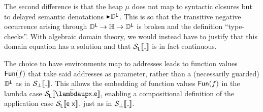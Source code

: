 The second difference is that the heap $μ$ does not map to syntactic closures
but to delayed semantic denotations $\later \VanD$.
This is so that the transitive negative occurrence arising through
${\mathbb{D}^{\mathop{\mathsf{L}}}} \to \mathbb{H} \to {\mathbb{D}^{\mathop{\mathsf{L}}}}$ is broken and the definition ``type-checks''.
With algebraic domain theory, we would instead have to justify that this
domain equation has a solution and that $\semvan{\wild}$ is in fact continuous.

The choice to have environments map to addresses leads to function values
$\mathsf{Fun}(f)$ that take said addresses as parameter, rather than a (necessarily
guarded) ${\mathbb{D}^{\mathop{\mathsf{L}}}}$ as in $\semscott{\wild}$.%
This allows the embedding of function values $\mathsf{Fun}(f)$ in the lambda case
$\semvan{\Lam{\px}{\pe}}$, enabling a compositional definition of the
application case $\mathcal{S}_{\mathop{\mathsf{L}}}\llbracket {\mathsf{e}~\mathsf{x}} \rrbracket$, just as in $\semscott{\wild}$.


